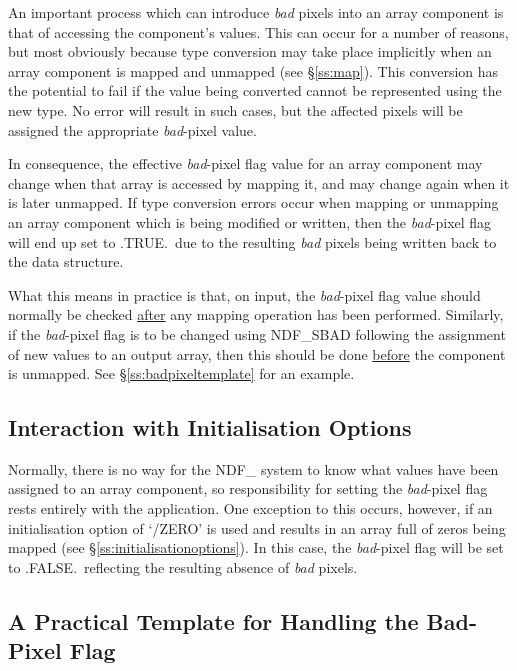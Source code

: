 \documentclass[twoside,11pt]{article}
\newcommand{\htmlref}[2]{#1}
\newcommand{\xlabel}[1]{}
\newcommand{\st}[1]{{\em{#1}}}
\begin{document}
An important process which can introduce \st{bad\/} pixels into an array
component is that of accessing the component's values. 
This can occur for a number of reasons, but most obviously because type
conversion may take place implicitly when an array component is mapped and
unmapped (see \S\ref{ss:map}).
This conversion has the potential to fail if the value being converted
cannot be represented using the new type. 
No error will result in such cases, but the affected pixels will be assigned
the appropriate \st{bad\/}-pixel value. 

In consequence, the effective \st{bad\/}-pixel flag value for an array
component may change when that array is accessed by mapping it, and may
change again when it is later unmapped. 
If type conversion errors occur when mapping or unmapping an array component
which is being modified or written, then the \st{bad\/}-pixel flag will end
up set to .TRUE.\ due to the resulting \st{bad\/} pixels being written back to
the data structure. 

What this means in practice is that, on input, the \st{bad\/}-pixel flag
value should normally be checked \underline{after} any mapping operation
has been performed. 
Similarly, if the \st{bad\/}-pixel flag is to be changed using \htmlref{NDF\_SBAD}{NDF_SBAD}
following the assignment of new values to an output array, then this should
be done \underline{before} the component is unmapped.
See \S\ref{ss:badpixeltemplate} for an example.

\subsection{\xlabel{interaction_with_initialisation_options}Interaction with Initialisation Options}

Normally, there is no way for the NDF\_ system to know what values have been 
assigned to an array component, so responsibility for setting the
\st{bad\/}-pixel flag rests entirely with the application. 
One exception to this occurs, however, if an initialisation option of
`/ZERO' is used and results in an array full of zeros being mapped (see
\S\ref{ss:initialisationoptions}). 
In this case, the \st{bad\/}-pixel flag will be set to .FALSE.\ reflecting the
resulting absence of \st{bad\/} pixels. 

\subsection{\xlabel{a_practical_template_for_handling_the_bad-pixel_flag}\label{ss:badpixeltemplate}A Practical Template for Handling the Bad-Pixel Flag}
\end{document}
